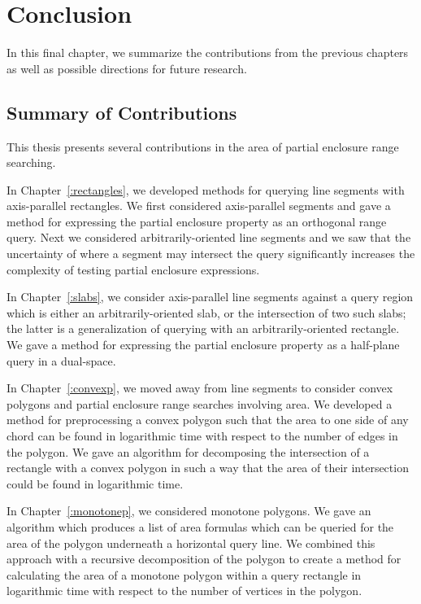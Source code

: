 \chapter{Conclusion}
\label{:conclusion}

In this final chapter, we summarize the contributions from the previous chapters as well as possible directions for future research.

\section{Summary of Contributions}
\label{:conclusion:contributions}

This thesis presents several contributions in the area of partial enclosure range searching.

In Chapter~\ref{:rectangles}, we developed methods for querying line segments with axis-parallel rectangles. 
We first considered axis-parallel segments and gave a method for expressing the partial enclosure property as an orthogonal range query. 
Next we considered arbitrarily-oriented line segments and we saw that the uncertainty of where a segment may intersect the query significantly increases the complexity of testing partial enclosure expressions.

In Chapter~\ref{:slabs}, we consider axis-parallel line segments against a query region which is either an arbitrarily-oriented slab, or the intersection of two such slabs; the latter is a generalization of querying with an arbitrarily-oriented rectangle. 
We gave a method for expressing the partial enclosure property as a half-plane query in a dual-space.

In Chapter~\ref{:convexp}, we moved away from line segments to consider convex polygons and partial enclosure range searches involving area. 
We developed a method for preprocessing a convex polygon such that the area to one side of any chord can be found in logarithmic time with respect to the number of edges in the polygon. 
We gave an algorithm for decomposing the intersection of a rectangle with a convex polygon in such a way that the area of their intersection could be found in logarithmic time. 

In Chapter~\ref{:monotonep}, we considered monotone polygons. 
We gave an algorithm which produces a list of area formulas which can be queried for the area of the polygon underneath a horizontal query line.
We combined this approach with a recursive decomposition of the polygon to create a method for calculating the area of a monotone polygon within a query rectangle in logarithmic time with respect to the number of vertices in the polygon. 


